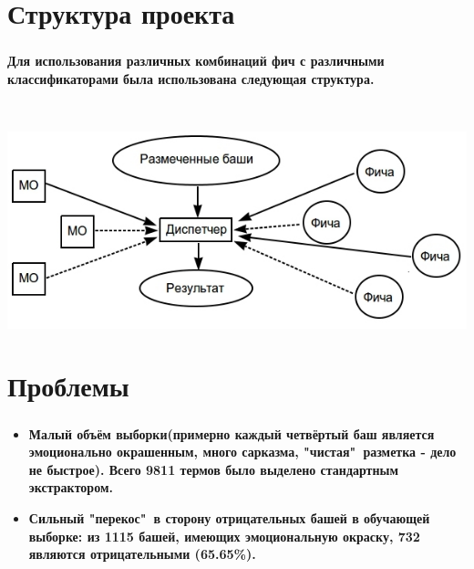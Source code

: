 \documentclass[t]{beamer}
\begin{document}
	
	
	
	\section{Структура проекта}
	\begin{frame}
		\frametitle{\insertsection}
		\framesubtitle{\insertsubsection}
		\textbf{Для использования различных комбинаций фич с различными классификаторами была использована следующая структура.}
		
		
		~
		
		\includegraphics[scale=0.52]{images/TheManager.jpg}
	\end{frame}	
	
	
	\section{Проблемы}
	
	\begin{frame}
		\frametitle{\insertsection}
		\begin{itemize}
			\item{\textbf{Малый объём выборки(примерно каждый четвёртый баш является эмоционально окрашенным, много сарказма, "чистая"\ разметка - дело не быстрое). Всего 9811 термов было выделено стандартным экстрактором.}}
			\item{\textbf{Сильный "перекос"\ в сторону отрицательных башей в обучающей выборке: из 1115 башей, имеющих эмоциональную окраску, 732 являются отрицательными (65.65\%).}}
		\end{itemize}
	\end{frame}
\end{document}
